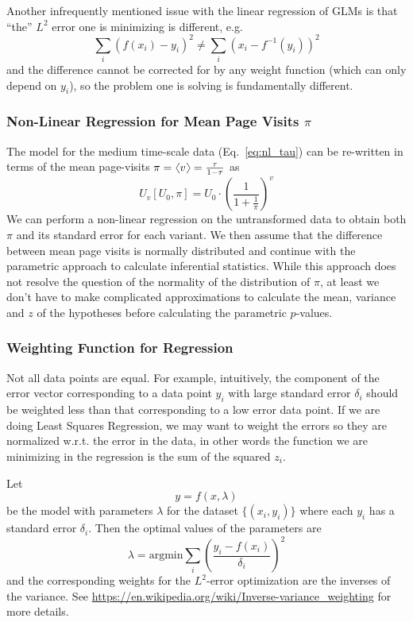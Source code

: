 \documentclass[12pt]{report}
\newcommand{\beq}{\begin{equation}} %
\newcommand{\eeq}{\end{equation}} %
\newcommand{\bdm}{\begin{displaymath}} %
\newcommand{\edm}{\end{displaymath}} %
\newcommand{\langl}{\begin{picture}(4.5,7)
\put(1.1,2.5){\rotatebox{60}{\line(1,0){5.5}}}
\put(1.1,2.5){\rotatebox{300}{\line(1,0){5.5}}}
\end{picture}}
\newcommand{\rangl}{\begin{picture}(4.5,7)
\put(.9,2.5){\rotatebox{120}{\line(1,0){5.5}}}
\put(.9,2.5){\rotatebox{240}{\line(1,0){5.5}}}
\end{picture}}
\newcommand{\mymean}[1]{\ensuremath{\langl{#1}\rangl}} %
\begin{document}
Another infrequently mentioned issue with the linear regression of
GLMs is that ``the'' \(L^2\) error one is minimizing is different,
e.g.
\bdm
\sum_i\left(f(x_i)-y_i\right)^2 \neq \sum_i\left( x_i-f^{-1}(y_i)\right)^2
\edm
and the difference cannot be corrected for by any weight function
(which can only depend on \(y_i\)), so the problem one is solving is
fundamentally different.

\subsubsection{Non-Linear Regression for Mean Page Visits \(\pi\)}
\label{sec:NLR}
The model for the medium time-scale data (Eq.~\ref{eq:nl_tau}) can be
re-written in terms of the mean page-visits \(\pi = \mymean{v} =
\frac{\tau}{1-\tau}\) as \beq\label{eq:nl_pi} U_v[U_0,\pi]=U_0\cdot
\left(\frac{1}{1+\frac{1}{\pi}}\right)^v \eeq We can perform a
non-linear regression on the untransformed data to obtain both \(\pi\)
and its standard error for each variant. We then assume that the
difference between mean page visits is normally distributed and
continue with the parametric approach to calculate inferential
statistics. While this approach does not resolve the question of the
normality of the distribution of \(\pi\), at least we don't have to
make complicated approximations to calculate the mean, variance and
\(z\) of the hypotheses before calculating the parametric
\(p\)-values.

\subsubsection{Weighting Function for Regression}\label{sec:weightsvariance}
Not all data points are equal. For example, intuitively, the component
of the error vector corresponding to a data point \(y_i\) with large
standard error \(\delta_i\) should be weighted less than that
corresponding to a low error data point. If we are doing Least Squares
Regression, we may want to weight the errors so they are normalized
w.r.t. the error in the data, in other words the function we are
minimizing in the regression is the sum of the squared \(z_i\).

Let \bdm y=f(x,\lambda) \edm be the model with parameters \(\lambda\)
for the dataset \(\{(x_i,y_i)\}\) where each \(y_i\) has a standard
error \(\delta_i\). Then the optimal values of the parameters are
\beq\label{eq:l2z}
\lambda = \text{argmin} \sum_i
  \left(\frac{y_i-f(x_i)}{\delta_i}\right)^2
\eeq
and the corresponding weights for the \(L^2\)-error optimization are
the inverses of the variance. See
\url{https://en.wikipedia.org/wiki/Inverse-variance_weighting} for
more details.
\end{document}
